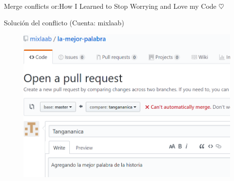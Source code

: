 \documentclass[10pt]{beamer}
\begin{document}


    


\begin{frame}{Merge conflicts or:}{How I Learned to Stop Worrying and Love my Code $\heartsuit$}

\begin{block}{Solución del conflicto (Cuenta: mixlaab)}

\begin{figure}[h!]
\centering
\includegraphics [scale=0.25]{conflict}
\label{fig:issues}
\end{figure}
    
\end{block}

\end{frame}
\end{document}
